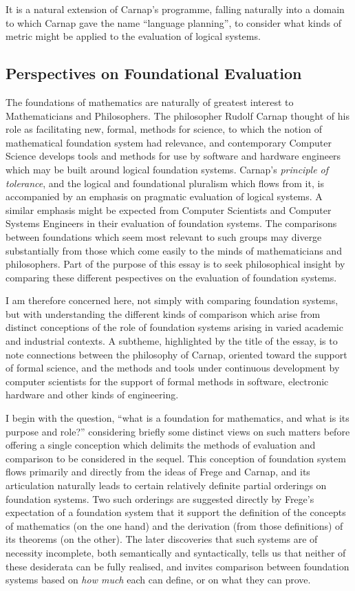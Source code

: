 \documentclass[10pt,titlepage]{article}
\begin{document}
It is a natural extension of Carnap's programme, falling naturally into a domain to which Carnap gave the name ``language planning'', to consider what kinds of metric might be applied to the evaluation of logical systems.

\pagebreak
\subsection{Perspectives on Foundational Evaluation}

The foundations of mathematics are naturally of greatest interest to Mathematicians and Philosophers.
The philosopher Rudolf Carnap thought of his role as facilitating new, formal, methods for science, to which the notion of mathematical foundation system had relevance, and contemporary Computer Science develops tools and methods for use by software and hardware engineers which may be built around logical foundation systems.
Carnap's \emph{principle of tolerance}, and the logical and foundational pluralism which flows from it, is accompanied by an emphasis on pragmatic evaluation of logical systems.
A similar emphasis might be expected from Computer Scientists and Computer Systems Engineers in their evaluation of foundation systems.
The comparisons between foundations which seem most relevant to such groups may diverge substantially from those which come easily to the minds of mathematicians and philosophers.
Part of the purpose of this essay is to seek philosophical insight by comparing these different pespectives on the evaluation of foundation systems.

I am therefore concerned here, not simply with comparing foundation systems, but with understanding the different kinds of comparison which arise from distinct conceptions of the role of foundation systems arising in varied academic and industrial contexts.
A subtheme, highlighted by the title of the essay, is to note connections between the philosophy of Carnap, oriented toward the support of formal science, and the methods and tools under continuous development by computer scientists for the support of formal methods in software, electronic hardware and other kinds of engineering.

I begin with the question, ``what is a foundation for mathematics, and what is its purpose and role?'' considering briefly some distinct views on such matters before offering a single conception which delimits the methods of evaluation and comparison to be considered in the sequel.
This conception of foundation system flows primarily and directly from the ideas of Frege and Carnap, and its articulation naturally leads to certain relatively definite partial orderings on foundation systems.
Two such orderings are suggested directly by Frege's expectation of a foundation system that it support the definition of the concepts of mathematics (on the one hand) and the derivation (from those definitions) of its theorems (on the other).
The later discoveries that such systems are of necessity incomplete, both semantically and syntactically, tells us that neither of these desiderata can be fully realised, and invites comparison between foundation systems based on \emph{how much} each can define, or on what they can prove.
\end{document}
